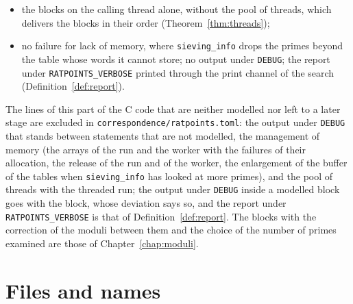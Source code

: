 \begin{itemize}
    masks, below $2^{40}$, and the negation of the quarter of \verb|LONG_MIN| in \verb|jacobi1|, the
    bounds of $p^m$ and $p^2$ in the loops of the forbidden divisors being those of the node of the
    divisors (Definition~\ref{def:setupUs1});
    and a denominator of the Jacobi test by tables is at most $\mathrm{mulModLimit} = 2^{32} - 1$,
    where \verb|RP_MULDIV| is exact; the valuations and the slopes of the records of the divisors,
    \verb|int|s in the C code, as natural numbers, which they fit for coefficients below
    $2^{2^{31} - 1}$;
  \item the blocks on the calling thread alone, without the pool of threads, which delivers the
    blocks in their order (Theorem~\ref{thm:threads});
  \item no failure for lack of memory, where \verb|sieving_info| drops the primes beyond the table
    whose words it cannot store; no output under \verb|DEBUG|; the report under
    \verb|RATPOINTS_VERBOSE| printed through the print channel of the search
    (Definition~\ref{def:report}).
\end{itemize}
The lines of this part of the C code that are neither modelled nor left to a later stage are
excluded in \verb|correspondence/ratpoints.toml|: the output under \verb|DEBUG| that stands between
statements that are not modelled, the management of memory (the arrays of the run and the worker
with the failures of their allocation, the release of the run and of the worker, the enlargement of
the buffer of the tables when \verb|sieving_info| has looked at more primes), and the pool of
threads with the threaded run; the output under \verb|DEBUG| inside a modelled block goes with the
block, whose deviation says so, and the report under \verb|RATPOINTS_VERBOSE| is that of
Definition~\ref{def:report}. The blocks with the correction of the
moduli between them and the choice of the number of primes examined are those of
Chapter~\ref{chap:moduli}.

\section{Files and names}

